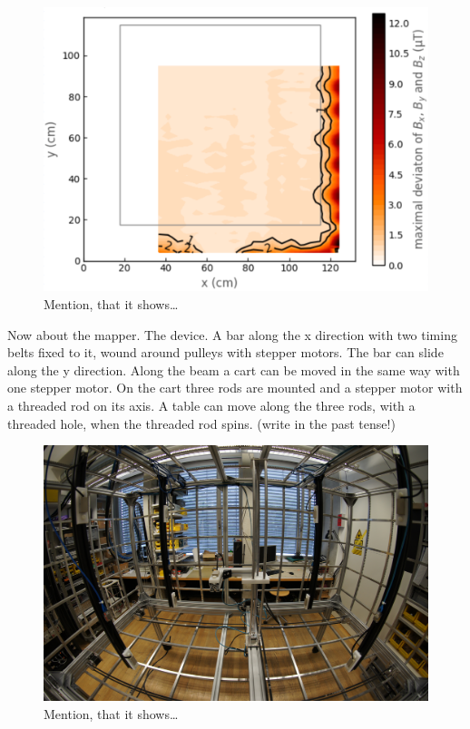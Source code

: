 \begin{figure}
  \centering
  \includegraphics[width=0.9\linewidth]{gfx/prototype/plane_map.png}
  \caption{Mention, that it shows\ldots}
  \label{fig:prototype_plane_map}
\end{figure}

Now about the mapper. The device. A bar along the x direction with two timing belts fixed to it, wound around pulleys with stepper motors. The bar can slide along the y direction. Along the beam a cart can be moved in the same way with one stepper motor. On the cart three rods are mounted and a stepper motor with a threaded rod on its axis. A table can move along the three rods, with a threaded hole, when the threaded rod spins. (write in the past tense!)

\begin{figure}
  \centering
  \includegraphics[width=0.9\linewidth]{gfx/prototype/DSC03476.JPG}
  \caption{Mention, that it shows\ldots}
  \label{fig:prototype_photo_inside}
\end{figure}


